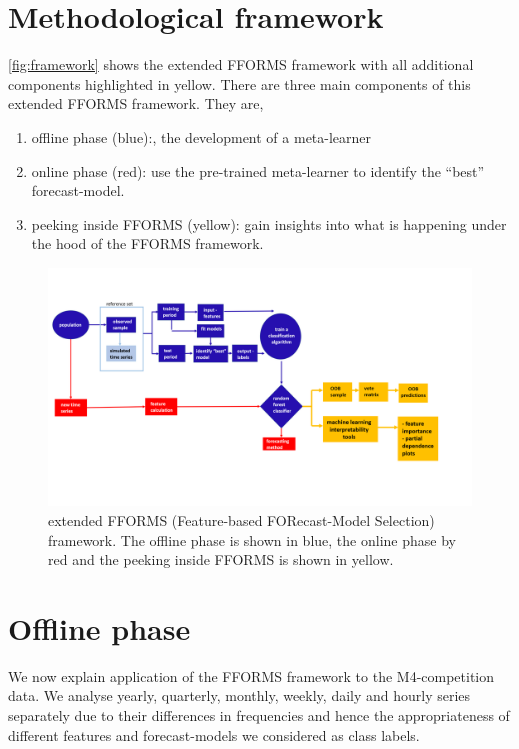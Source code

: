 \documentclass[11pt,a4paper,]{article}
\providecommand{\tightlist}{%
  \setlength{\itemsep}{0pt}\setlength{\parskip}{0pt}}
\begin{document}
\hypertarget{fforms}{%
\section{Methodological framework}\label{fforms}}

\autoref{fig:framework} shows the extended FFORMS framework with all additional components highlighted in yellow. There are three main components of this extended FFORMS framework. They are,

\begin{enumerate}
\def\labelenumi{\arabic{enumi}.}
\tightlist
\item
  offline phase (blue):, the development of a meta-learner
\item
  online phase (red): use the pre-trained meta-learner to identify the ``best'' forecast-model.
\item
  peeking inside FFORMS (yellow): gain insights into what is happening under the hood of the FFORMS framework.
\end{enumerate}

\begin{figure}[h]
\includegraphics[width=1.1\linewidth]{img/framework2} \caption{extended FFORMS (Feature-based FORecast-Model Selection) framework. The offline phase is shown in blue, the online phase by red and the peeking inside FFORMS is shown in yellow.}\label{fig:framework}
\end{figure}

\hypertarget{offline}{%
\section{Offline phase}\label{offline}}

We now explain application of the FFORMS framework to the M4-competition data. We analyse yearly, quarterly, monthly, weekly, daily and hourly series separately due to their differences in frequencies and hence the appropriateness of different features and forecast-models we considered as class labels.
\end{document}

